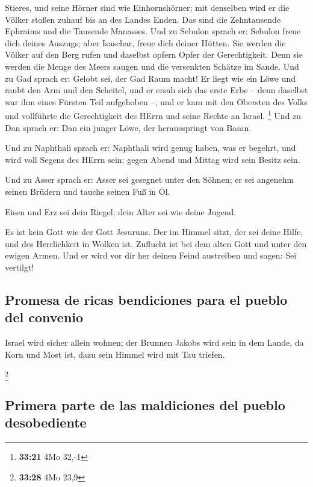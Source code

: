 Stieres, und seine Hörner sind wie Einhornshörner; mit denselben wird er
die Völker stoßen zuhauf bis an des Landes Enden. Das sind die
Zehntausende Ephraims und die Tausende Manasses.  Und zu
Sebulon sprach er: Sebulon freue dich deines Auszugs; aber Isaschar,
freue dich deiner Hütten.  Sie werden die Völker auf den
Berg rufen und daselbst opfern Opfer der Gerechtigkeit. Denn sie werden
die Menge des Meers saugen und die versenkten Schätze im Sande.
 Und zu Gad sprach er: Gelobt sei, der Gad Raum macht! Er
liegt wie ein Löwe und raubt den Arm und den Scheitel, 
und er ersah sich das erste Erbe -- denn daselbst war ihm eines Fürsten
Teil aufgehoben --, und er kam mit den Obersten des Volks und vollführte
die Gerechtigkeit des HErrn und seine Rechte an Israel. \footnote{\textbf{33:21}
  4Mo 32,-1}  Und zu Dan sprach er: Dan ein junger Löwe,
der herausspringt von Basan.

 Und zu Naphthali sprach er: Naphthali wird genug haben,
was er begehrt, und wird voll Segens des HErrn sein; gegen Abend und
Mittag wird sein Besitz sein.

 Und zu Asser sprach er: Asser sei gesegnet unter den
Söhnen; er sei angenehm seinen Brüdern und tauche seinen Fuß in Öl.

 Eisen und Erz sei dein Riegel; dein Alter sei wie deine
Jugend.

 Es ist kein Gott wie der Gott Jesuruns. Der im Himmel
sitzt, der sei deine Hilfe, und des Herrlichkeit in Wolken ist.
 Zuflucht ist bei dem alten Gott und unter den ewigen
Armen. Und er wird vor dir her deinen Feind austreiben und sagen: Sei
vertilgt!

\hypertarget{promesa-de-ricas-bendiciones-para-el-pueblo-del-convenio}{%
\subsection{Promesa de ricas bendiciones para el pueblo del
convenio}\label{promesa-de-ricas-bendiciones-para-el-pueblo-del-convenio}}

 Israel wird sicher allein wohnen; der Brunnen Jakobs
wird sein in dem Lande, da Korn und Most ist, dazu sein Himmel wird mit
Tau triefen.

\footnote{\textbf{33:28} 4Mo 23,9}

\hypertarget{primera-parte-de-las-maldiciones-del-pueblo-desobediente}{%
\subsection{Primera parte de las maldiciones del pueblo
desobediente}\label{primera-parte-de-las-maldiciones-del-pueblo-desobediente}}

